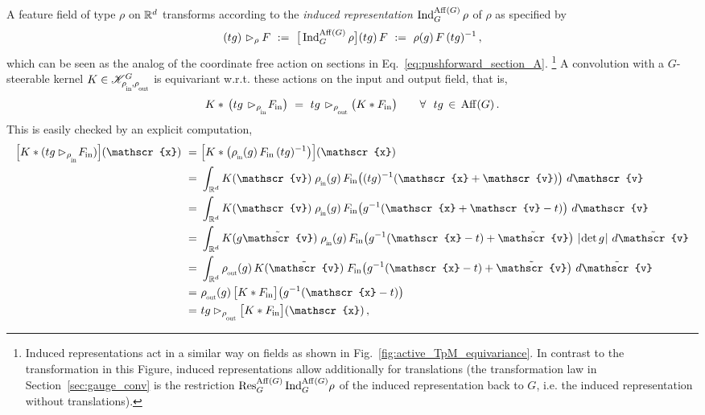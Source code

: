 A feature field of type $\rho$ on $\mathbb{R}^d$ transforms according to the \emph{induced representation} $\operatorname{Ind}_G^{\operatorname{Aff}(G)} \rho$ of $\rho$ as specified by
\begin{align}\label{eq:induced_rep_affine}
    (tg) \mkern2mu\rhd_\rho F \ :=\ \big[\operatorname{Ind}_G^{\operatorname{Aff}(G)} \rho\big](tg)\, F \ :=\ \rho(g)\, F\, (tg)^{-1} \,,
\end{align}
which can be seen as the analog of the coordinate free action on sections in Eq.~\eqref{eq:pushforward_section_A}.%
\footnote{
    Induced representations act in a similar way on fields as shown in Fig.~\ref{fig:active_TpM_equivariance}.
    In contrast to the transformation in this Figure, induced representations allow additionally for translations (the transformation law in Section~\ref{sec:gauge_conv} is the restriction $\operatorname{Res}_G^{\operatorname{Aff}(G)}\operatorname{Ind}_G^{\operatorname{Aff}(G)}\!\rho$ of the induced representation back to $G$, i.e. the induced representation without translations).
}
A convolution with a $G$-steerable kernel $K \in \KG$ is equivariant w.r.t. these actions on the input and output field, that is,
\begin{align}\label{eq:Euclidean_conv_equiv_in_coords_Rd}
     K *\, \big(tg \,\rhd_{\rhoin}\! \Fin \big)\ =\ tg \,\rhd_{\rhoout} \big( K*\Fin \big) \qquad \forall\ \ tg \,\in\, \Aff(G) \,.
\end{align}
This is easily checked by an explicit computation,
\begin{align}
     \pig[ K * (tg \rhd_{\rhoin}\! \Fin) \pig] (\mathscr{x})
    \ =&\ \pig[ K * \big(\rhoin(g)\, \Fin\, (tg)^{-1}\big) \pig] (\mathscr{x}) \notag \\
    \ =&\ \int_{\R^d} K(\mathscr{v})\; \rhoin(g)\, \Fin \big((tg)^{-1} (\mathscr{x} + \mathscr{v}) \big)\ d\mathscr{v} \notag \\
    \ =&\ \int_{\R^d} K(\mathscr{v})\; \rhoin(g)\, \Fin \big(g^{-1}( \mathscr{x} + \mathscr{v} - t)\big)\ d\mathscr{v} \notag \\
    \ =&\ \int_{\R^d} K(g \tilde{\mathscr{v}})\; \rhoin(g)\, \Fin \big(g^{-1}(\mathscr{x} - t) + \tilde{\mathscr{v}}\big)\ \detg\ d\tilde{\mathscr{v}} \notag \\
    \ =&\ \int_{\R^d} \rhoout(g)\, K(\tilde{\mathscr{v}})\; \Fin \big(g^{-1}(\mathscr{x} - t) + \tilde{\mathscr{v}}\big)\ d\tilde{\mathscr{v}} \notag \\
    \ =&\ \rhoout(g)\, \big[ K * \Fin \big] \big(g^{-1}(\mathscr{x}-t)\big) \notag \\
    \ =&\ tg \rhd_{\rhoout} \big[K * \Fin \big] (\mathscr{x}) \,,
\end{align}
